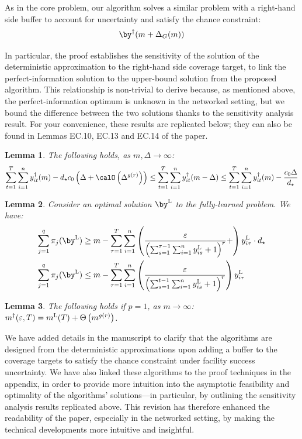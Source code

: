 \documentclass[11pt]{article}
\newtheorem{lemma}{Lemma}[]
\begin{document}
As in the core problem, our algorithm solves a similar problem with a right-hand side buffer to account for uncertainty and satisfy the chance constraint:
$$\by^\dagger(m+\Delta_G(m))$$

In particular, the proof establishes the sensitivity of the solution of the deterministic approximation to the right-hand side coverage target, to link the perfect-information solution to the upper-bound solution from the proposed algorithm. This relationship is non-trivial to derive because, as mentioned above, the perfect-information optimum is unknown in the networked setting, but we bound the difference between the two solutions thanks to the sensitivity analysis result. For your convenience, these results are replicated below; they can also be found in Lemmas EC.10, EC.13 and EC.14 of the paper.
\renewcommand{\thelemma}{EC.10} 
\begin{lemma}\label{lem:gen_deter_sol_lower_AE}
   The following holds, as $m,\Delta\to \infty$:
   \begin{align*}
       \sum_{t=1}^T \sum_{i=1}^n y_{it}^\dagger(m)-d_\star c_0\left(\Delta+\calO\left(\Delta^{g(r)}\right)\right)\leq\sum_{t=1}^T \sum_{i=1}^n y_{it}^\dagger(m-\Delta)\leq \sum_{t=1}^T \sum_{i=1}^n y_{it}^\dagger(m)-\frac{c_0\Delta}{d_\star}
   \end{align*}
\end{lemma}
\renewcommand{\thelemma}{EC.13}
\begin{lemma}\label{lem:bound_loss_gen_AE}
   Consider an optimal solution $\by^{\textsc{L}}$ to the fully-learned problem. We have:
   \begin{align*}
   	\sum_{j=1}^q\pi_{j}(\by^{\textsc{L}})&\geq m-\sum_{\tau=1}^T \sum_{i =1}^n \left(\frac{\varepsilon}{\left(\sum_{s=1}^{\tau-1}\sum_{i=1}^n y^{\textsc{L}}_{is}+1\right)^r}+\right)y^{\textsc{L}}_{i\tau}\cdot d_\star\\
	\sum_{j=1}^q\pi_{j}(\by^{\textsc{L}})&\leq m-\sum_{\tau=1}^T\sum_{i=1}^n\left(\frac{\varepsilon}{\left(\sum_{s=1}^{t-1}\sum_{i=1}^n y^{\textsc{L}}_{is}+1\right)^r}\right)y^{\textsc{L}}_{i\tau}
   \end{align*}
\end{lemma}
\renewcommand{\thelemma}{EC.14} 
\begin{lemma}\label{lem:network_deter_lower_AE}
   The following holds if $p=1$, as $m\to\infty$: $m^\dagger(\varepsilon, T) =  m^{\textsc{L}}(T) + \Theta\left(m^{g(r)}\right)$.
\end{lemma}
\renewcommand{\thelemma}{\arabic{lemma}}
We have added details in the manuscript to clarify that the algorithms are designed from the deterministic approximations upon adding a buffer to the coverage targets to satisfy the chance constraint under facility success uncertainty. We have also linked these algorithms to the proof techniques in the appendix, in order to provide more intuition into the asymptotic feasibility and optimality of the algorithms' solutions---in particular, by outlining the sensitivity analysis results replicated above. This revision has therefore enhanced the readability of the paper, especially in the networked setting, by making the technical developments more intuitive and insightful.
\end{document}
